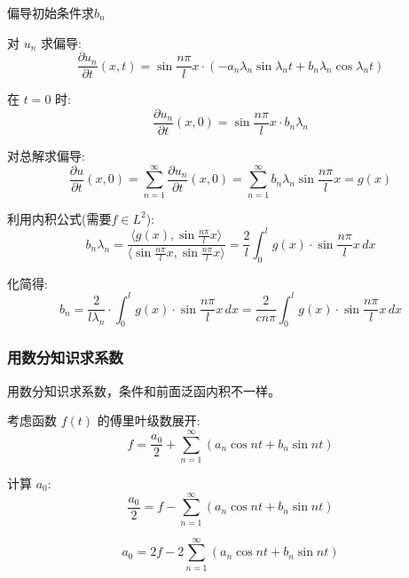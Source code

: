 \documentclass[12pt,a4paper]{article}
\numberwithin{subsection}{section}
\numberwithin{subsubsection}{subsection}
\theoremstyle{plain}
\theoremstyle{definition}
\theoremstyle{remark}
\begin{document}
	偏导初始条件求$b_n$
	
	对 \(u_n\) 求偏导:
	\begin{equation}
		\frac{\partial u_n}{\partial t}(x, t) = \sin \frac{n\pi}{l} x \cdot \left( -a_n \lambda_n \sin \lambda_n t + b_n \lambda_n \cos \lambda_n t \right)
	\end{equation}
	
	在 \(t = 0\) 时:
	\begin{equation}
		\frac{\partial u_n}{\partial t}(x, 0) = \sin \frac{n\pi}{l} x \cdot b_n \lambda_n
	\end{equation}
	
	对总解求偏导:
	\begin{equation}
		\frac{\partial u}{\partial t}(x, 0) = \sum_{n=1}^{\infty} \frac{\partial u_n}{\partial t}(x, 0) = \sum_{n=1}^{\infty} b_n \lambda_n \sin \frac{n\pi}{l} x = g(x)
	\end{equation}
	
	利用内积公式(需要$f \in L^2$):
	\begin{equation}
		b_n \lambda_n = \frac{\langle g(x), \sin \frac{n\pi}{l} x \rangle}{\langle \sin \frac{n\pi}{l} x, \sin \frac{n\pi}{l} x \rangle} = \frac{2}{l} \int_0^l g(x) \cdot \sin \frac{n\pi}{l} x \, dx
	\end{equation}
	
	化简得:
	\begin{equation}
		b_n = \frac{2}{l \lambda_n} \cdot \int_0^l g(x) \cdot \sin \frac{n\pi}{l} x \, dx = \frac{2}{c n \pi} \int_0^l g(x) \cdot \sin \frac{n\pi}{l} x \, dx
	\end{equation}
	
	\subsubsection{用数分知识求系数}
	用数分知识求系数，条件和前面泛函内积不一样。
	
	考虑函数 \( f(t) \) 的傅里叶级数展开:
	\begin{equation}
		f = \frac{a_0}{2} + \sum_{n=1}^{\infty} \left( a_n \cos nt + b_n \sin nt \right)
	\end{equation}
	
	计算 \( a_0 \):
	\begin{equation}
		\frac{a_0}{2} = f - \sum_{n=1}^{\infty} \left( a_n \cos nt + b_n \sin nt \right)
	\end{equation}
	
	\begin{equation}
		a_0 = 2f - 2 \sum_{n=1}^{\infty} \left( a_n \cos nt + b_n \sin nt \right)
	\end{equation}
	
\end{document}
